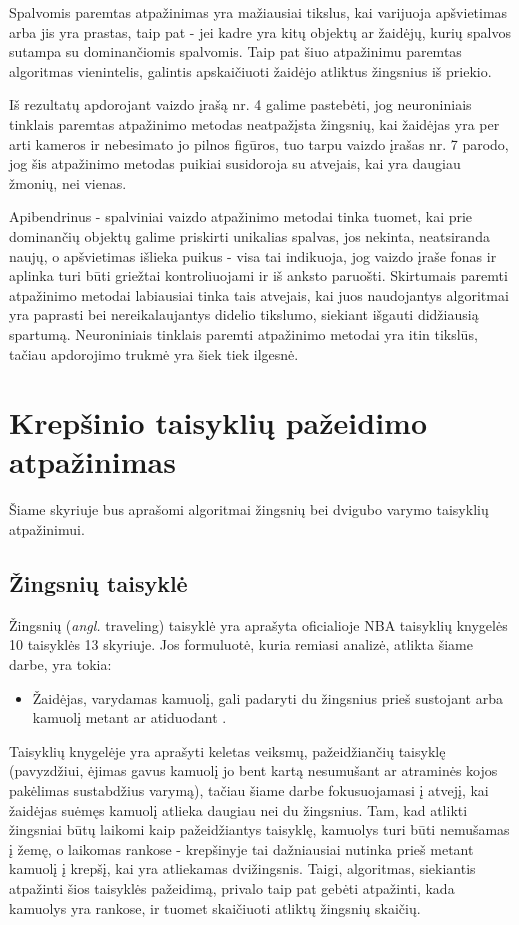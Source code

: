 \documentclass{VUMIFPSbakalaurinis}
\begin{document}
Spalvomis paremtas atpažinimas yra mažiausiai tikslus, kai varijuoja apšvietimas arba jis yra prastas, taip pat - jei kadre yra kitų objektų ar žaidėjų, kurių spalvos sutampa su dominančiomis spalvomis. Taip pat šiuo atpažinimu paremtas algoritmas vienintelis, galintis apskaičiuoti žaidėjo atliktus žingsnius iš priekio. 

Iš rezultatų apdorojant vaizdo įrašą nr. 4 galime pastebėti, jog neuroniniais tinklais paremtas atpažinimo metodas neatpažįsta žingsnių, kai žaidėjas yra per arti kameros ir nebesimato jo pilnos figūros, tuo tarpu vaizdo įrašas nr. 7 parodo, jog šis atpažinimo metodas puikiai susidoroja su atvejais, kai yra daugiau žmonių, nei vienas. 

Apibendrinus - spalviniai vaizdo atpažinimo metodai tinka tuomet, kai prie dominančių objektų galime priskirti unikalias spalvas, jos nekinta, neatsiranda naujų, o apšvietimas išlieka puikus - visa tai indikuoja, jog vaizdo įraše fonas ir aplinka turi būti griežtai kontroliuojami ir iš anksto paruošti. Skirtumais paremti atpažinimo metodai labiausiai tinka tais atvejais, kai juos naudojantys algoritmai yra paprasti bei nereikalaujantys didelio tikslumo, siekiant išgauti didžiausią spartumą. Neuroniniais tinklais paremti atpažinimo metodai yra itin tikslūs, tačiau apdorojimo trukmė yra šiek tiek ilgesnė.

\section{Krepšinio taisyklių pažeidimo atpažinimas}

Šiame skyriuje bus aprašomi algoritmai žingsnių bei dvigubo varymo taisyklių atpažinimui.

\subsection{Žingsnių taisyklė}
Žingsnių (\textit{angl.} traveling) taisyklė yra aprašyta oficialioje NBA taisyklių knygelės 10 taisyklės 13 skyriuje. Jos formuluotė, kuria remiasi analizė, atlikta šiame darbe, yra tokia: 

\begin{itemize}
	\item Žaidėjas, varydamas kamuolį, gali padaryti du žingsnius prieš sustojant arba kamuolį metant ar atiduodant \cite{nba-rules}. 
\end{itemize}

Taisyklių knygelėje yra aprašyti keletas veiksmų, pažeidžiančių taisyklę (pavyzdžiui, ėjimas gavus kamuolį jo bent kartą nesumušant ar atraminės kojos pakėlimas sustabdžius varymą), tačiau šiame darbe fokusuojamasi į atvejį, kai žaidėjas suėmęs kamuolį atlieka daugiau nei du žingsnius. Tam, kad atlikti žingsniai būtų laikomi kaip pažeidžiantys taisyklę, kamuolys turi būti nemušamas į žemę, o laikomas rankose - krepšinyje tai dažniausiai nutinka prieš metant kamuolį į krepšį, kai yra atliekamas dvižingsnis. Taigi, algoritmas, siekiantis atpažinti šios taisyklės pažeidimą, privalo taip pat gebėti atpažinti, kada kamuolys yra rankose, ir tuomet skaičiuoti atliktų žingsnių skaičių. 
\end{document}
